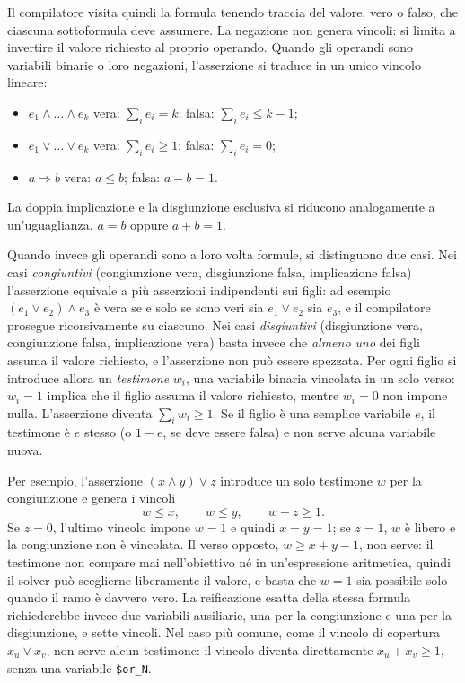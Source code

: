 Il compilatore visita quindi la formula tenendo traccia del valore, vero o
falso, che ciascuna sottoformula deve assumere. La negazione non genera vincoli:
si limita a invertire il valore richiesto al proprio operando. Quando gli
operandi sono variabili binarie o loro negazioni, l'asserzione si traduce in un
unico vincolo lineare:

\begin{itemize}
  \item $e_1 \land \dots \land e_k$ vera: $\sum_i e_i = k$; falsa:
        $\sum_i e_i \le k - 1$;
  \item $e_1 \lor \dots \lor e_k$ vera: $\sum_i e_i \ge 1$; falsa:
        $\sum_i e_i = 0$;
  \item $a \Rightarrow b$ vera: $a \le b$; falsa: $a - b = 1$.
\end{itemize}

\noindent La doppia implicazione e la disgiunzione esclusiva si riducono
analogamente a un'uguaglianza, $a = b$ oppure $a + b = 1$.

Quando invece gli operandi sono a loro volta formule, si distinguono due casi.
Nei casi \emph{congiuntivi} (congiunzione vera, disgiunzione falsa, implicazione
falsa) l'asserzione equivale a più asserzioni indipendenti sui figli: ad esempio
$(e_1 \lor e_2) \land e_3$ è vera se e solo se sono veri sia $e_1 \lor e_2$ sia
$e_3$, e il compilatore prosegue ricorsivamente su ciascuno. Nei casi
\emph{disgiuntivi} (disgiunzione vera, congiunzione falsa, implicazione vera)
basta invece che \emph{almeno uno} dei figli assuma il valore richiesto, e
l'asserzione non può essere spezzata. Per ogni figlio si introduce allora un
\emph{testimone} $w_i$, una variabile binaria vincolata in un solo verso:
$w_i = 1$ implica che il figlio assuma il valore richiesto, mentre $w_i = 0$ non
impone nulla. L'asserzione diventa $\sum_i w_i \ge 1$. Se il figlio è una
semplice variabile $e$, il testimone è $e$ stesso (o $1 - e$, se deve essere
falsa) e non serve alcuna variabile nuova.

Per esempio, l'asserzione $(x \land y) \lor z$ introduce un solo testimone $w$
per la congiunzione e genera i vincoli
\begin{equation}
\label{eq:witness}
w \le x, \qquad w \le y, \qquad w + z \ge 1.
\end{equation}
Se $z = 0$, l'ultimo vincolo impone $w = 1$ e quindi $x = y = 1$; se $z = 1$, $w$
è libero e la congiunzione non è vincolata. Il verso opposto,
$w \ge x + y - 1$, non serve: il testimone non compare mai nell'obiettivo né in
un'espressione aritmetica, quindi il solver può sceglierne liberamente il valore,
e basta che $w = 1$ sia possibile solo quando il ramo è davvero vero. La
reificazione esatta della stessa formula richiederebbe invece due variabili
ausiliarie, una per la congiunzione e una per la disgiunzione, e sette vincoli.
Nel caso più comune, come il vincolo di copertura $x_u \lor x_v$, non serve
alcun testimone: il vincolo diventa direttamente $x_u + x_v \ge 1$, senza una
variabile \texttt{\$or\_N}.

